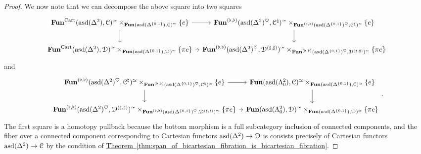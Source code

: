 \documentclass[main.tex]{subfiles}
\begin{document}
\begin{proof}
  We now note that we can decompose the above square into two squares
  \begin{equation*}
    \begin{tikzcd}[column sep=tiny]
      \Fun^{\Cart}(\asd(\Delta^{2}), \category{C})^{\simeq} \times_{\Fun(\asd(\Delta^{\{0, 1\}}), \category{C})^{\simeq}} \{e\}
      \arrow[r]
      \arrow[d]
      & \Fun^{(\flat, \flat)}(\asd(\Delta^{2})^{\heartsuit}, \category{C}^{\natural})^{\simeq} \times_{\Fun^{(\flat, \flat)}(\asd(\Delta^{\{0, 1\}})^{\heartsuit}, \category{C}^{\natural})^{\simeq}} \{e\}
      \arrow[d]
      \\
      \Fun^{\Cart}(\asd(\Delta^{2}), \category{D})^{\simeq} \times_{\Fun(\asd(\Delta^{\{0, 1\}}), \category{D})^{\simeq}} \{\pi e\}
      \arrow[r]
      & \Fun^{(\flat, \flat)}(\asd(\Delta^{2})^{\heartsuit}, \category{D}^{(\sharp, \sharp)})^{\simeq} \times_{\Fun^{(\flat, \flat)}(\asd(\Delta^{\{0, 1\}})^{\heartsuit}, \category{D}^{(\sharp, \sharp)})^{\simeq}} \{\pi e\}
    \end{tikzcd}
  \end{equation*}
  and
  \begin{equation*}
    \begin{tikzcd}[column sep=tiny]
      \Fun^{(\flat, \flat)}(\asd(\Delta^{2})^{\heartsuit}, \category{C}^{\natural})^{\simeq} \times_{\Fun^{(\flat, \flat)}(\asd(\Delta^{\{0, 1\}})^{\heartsuit}, \category{C}^{\natural})^{\simeq}} \{e\}
      \arrow[r]
      \arrow[d]
      & \Fun(\asd(\Lambda^{2}_{0}), \category{C})^{\simeq} \times_{\Fun(\asd(\Delta^{\{0, 1\}}), \category{C})^{\simeq}} \{e\}
      \arrow[d]
      \\
      \Fun^{(\flat, \flat)}(\asd(\Delta^{2})^{\heartsuit}, \category{D}^{(\sharp, \sharp)})^{\simeq} \times_{\Fun^{(\flat, \flat)}(\asd(\Delta^{\{0, 1\}})^{\heartsuit}, \category{D}^{(\sharp, \sharp)})^{\simeq}} \{\pi e\}
      \arrow[r]
      & \Fun(\asd(\Lambda^{2}_{0}), \category{D})^{\simeq} \times_{\Fun(\asd(\Delta^{\{0, 1\}}), \category{D})^{\simeq}} \{\pi e\}
    \end{tikzcd}.
  \end{equation*}
  The first square is a homotopy pullback because the bottom morphism is a full subcategory inclusion of connected components, and the fiber over a connected component corresponding to Cartesian functors $\mathrm{asd}(\Delta^{2}) \to \mathcal{D}$ is consists precisely of Cartesian functors $\mathrm{asd}(\Delta^{2}) \to \mathcal{C}$ by the condition of \hyperref[thm:span_of_bicartesian_fibration_is_bicartesian_fibration]{Theorem~\ref*{thm:span_of_bicartesian_fibration_is_bicartesian_fibration}}.


\end{proof}
\end{document}
